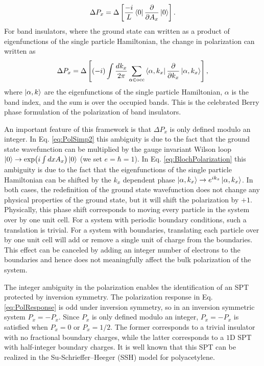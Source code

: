 \documentclass[prb,aps,twocolumn,groupaddress,floatfix]{revtex4-1}
\begin{document}
\begin{equation}
\Delta P_x =  \Delta \left[\frac{-i}{ L} \bra{0} \frac{\partial}{\partial A_{x}} \ket{0}\right].
\label{eq:PolSimp2}
\end{equation}
For band insulators, where the ground state can written as a product of eigenfunctions of the single particle Hamiltonian, the change in polarization can written as
\begin{equation}
\Delta P_x = \Delta \left[(-i) \int \frac{d k_x}{2\pi} \sum_{\alpha \in \text{occ}} \bra{\alpha, k_x} \frac{\partial}{\partial k_x} \ket{\alpha, k_x}\right],
\label{eq:BlochPolarization}
\end{equation}
where $\ket{\alpha, k}$ are the eigenfunctions of the single particle Hamiltonian, $\alpha$ is the band index, and the sum is over the occupied bands. This is the celebrated Berry phase formulation of the polarization of band insulators\cite{king1993, resta1994macroscopic}. 


An important feature of this framework is that $\Delta P_x$ is only defined modulo an integer. In Eq. \ref{eq:PolSimp2} this ambiguity is due to the fact that the ground state wavefunction can be multiplied by the gauge invariant Wilson loop $\ket{0}\rightarrow \exp(i \int dx A_x )\ket{0}$ (we set $e=\hbar=1$). In Eq. \ref{eq:BlochPolarization} this ambiguity is due to the fact that the eigenfunctions of the single particle Hamiltonian can be shifted by the $k_x$ dependent phase $\ket{\alpha, k_x} \rightarrow e^{ik_x}\ket{\alpha, k_x} $. In both cases, the redefinition of the ground state wavefunction does not change any physical properties of the ground state, but it will shift the polarization by $+1$. Physically, this phase shift corresponds to moving every particle in the system over by one unit cell. For a system with periodic boundary conditions, such a translation is trivial. For a system with boundaries, translating each particle over by one unit cell will add or remove a single unit of charge from the boundaries. This effect can be canceled by adding an integer number of electrons to the boundaries and hence does not meaningfully affect the bulk polarization of the system.

The integer ambiguity in the polarization enables the identification of an SPT protected by inversion symmetry. The polarization response in Eq. \ref{eq:PolResponse} is odd under inversion symmetry, so in an inversion symmetric system $P_x = -P_x$. Since $P_x$ is only defined modulo an integer, $P_x = -P_x$ is satisfied when $P_x = 0$ or $P_x = 1/2$. The former corresponds to a trivial insulator with no fractional boundary charges, while the latter corresponds to a $1$D SPT with half-integer boundary charges. It is well known that this SPT can be realized in the Su-Schrieffer–Heeger (SSH) model for polyacetylene\cite{su1979solitons}. 
\end{document}
